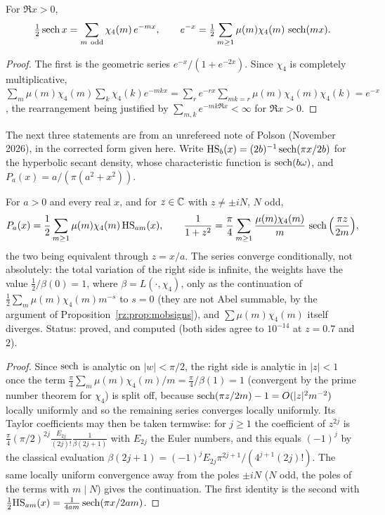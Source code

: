 \begin{proposition}\label{rz:prop:lvj}
For $\Re x>0$,
\[
\tfrac12\sech x=\sum_{m\ \mathrm{odd}}\chi_4(m)\,e^{-mx},
\qquad
e^{-x}=\tfrac12\sum_{m\ge1}\mu(m)\chi_4(m)\,\sech(mx).
\]
\end{proposition}

\begin{proof}
The first is the geometric series $e^{-x}/(1+e^{-2x})$. Since $\chi_4$ is completely multiplicative, $\sum_m\mu(m)\chi_4(m)\sum_k\chi_4(k)e^{-mkx}=\sum_r e^{-rx}\sum_{mk=r}\mu(m)\chi_4(m)\chi_4(k)=e^{-x}$, the rearrangement being justified by $\sum_{m,k}e^{-mk\Re x}<\infty$ for $\Re x>0$.
\end{proof}


The next three statements are from an unrefereed note of Polson (November 2026), in the corrected form given here. Write $\mathrm{HS}_b(x)=(2b)^{-1}\operatorname{sech}(\pi x/2b)$ for the hyperbolic secant density, whose characteristic function is $\operatorname{sech}(b\omega)$, and $P_a(x)=a/(\pi(a^2+x^2))$.

\begin{proposition}\label{rz:prop:cauchyhs}
For $a>0$ and every real $x$, and for $z\in\mathbb{C}$ with $z\ne\pm iN$, $N$ odd,
\[
P_a(x)=\frac12\sum_{m\ge1}\mu(m)\chi_4(m)\,\mathrm{HS}_{am}(x),\qquad
\frac1{1+z^2}=\frac\pi4\sum_{m\ge1}\frac{\mu(m)\chi_4(m)}m\,\operatorname{sech}\Big(\frac{\pi z}{2m}\Big),
\]
the two being equivalent through $z=x/a$. The series converge conditionally, not absolutely: the total variation of the right side is infinite, the weights have the value $\frac12/\beta(0)=1$, where $\beta=L(\cdot,\chi_4)$, only as the continuation of $\frac12\sum_m\mu(m)\chi_4(m)m^{-s}$ to $s=0$ (they are not Abel summable, by the argument of Proposition~\ref{rz:prop:mobsigns}), and $\sum\mu(m)\chi_4(m)$ itself diverges. Status: proved, and computed (both sides agree to $10^{-14}$ at $z=0.7$ and $2$).
\end{proposition}

\begin{proof}
Since $\operatorname{sech}$ is analytic on $|w|<\pi/2$, the right side is analytic in $|z|<1$ once the term $\frac\pi4\sum_m\mu(m)\chi_4(m)/m=\frac\pi4/\beta(1)=1$ (convergent by the prime number theorem for $\chi_4$) is split off, because $\operatorname{sech}(\pi z/2m)-1=O(|z|^2m^{-2})$ locally uniformly and so the remaining series converges locally uniformly. Its Taylor coefficients may then be taken termwise: for $j\ge1$ the coefficient of $z^{2j}$ is $\frac\pi4(\pi/2)^{2j}\frac{E_{2j}}{(2j)!}\frac1{\beta(2j+1)}$ with $E_{2j}$ the Euler numbers, and this equals $(-1)^j$ by the classical evaluation $\beta(2j+1)=(-1)^jE_{2j}\pi^{2j+1}/(4^{j+1}(2j)!)$. The same locally uniform convergence away from the poles $\pm iN$ ($N$ odd, the poles of the terms with $m\mid N$) gives the continuation. The first identity is the second with $\frac12\mathrm{HS}_{am}(x)=\frac1{4am}\operatorname{sech}(\pi x/2am)$.
\end{proof}

